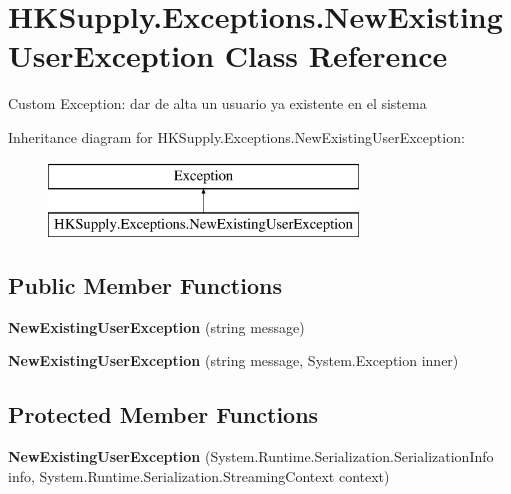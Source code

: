 \hypertarget{class_h_k_supply_1_1_exceptions_1_1_new_existing_user_exception}{}\section{H\+K\+Supply.\+Exceptions.\+New\+Existing\+User\+Exception Class Reference}
\label{class_h_k_supply_1_1_exceptions_1_1_new_existing_user_exception}


Custom Exception\+: dar de alta un usuario ya existente en el sistema  


Inheritance diagram for H\+K\+Supply.\+Exceptions.\+New\+Existing\+User\+Exception\+:\begin{figure}[H]
\begin{center}
\leavevmode
\includegraphics[height=2.000000cm]{class_h_k_supply_1_1_exceptions_1_1_new_existing_user_exception}
\end{center}
\end{figure}
\subsection*{Public Member Functions}
\begin{DoxyCompactItemize}
\item 
\mbox{\label{class_h_k_supply_1_1_exceptions_1_1_new_existing_user_exception_ab2021ca5058ce5ace749b56519f6fdab}} 
{\bfseries New\+Existing\+User\+Exception} (string message)
\item 
\mbox{\label{class_h_k_supply_1_1_exceptions_1_1_new_existing_user_exception_a8514fcb25cba282c24871071d9eb28bb}} 
{\bfseries New\+Existing\+User\+Exception} (string message, System.\+Exception inner)
\end{DoxyCompactItemize}
\subsection*{Protected Member Functions}
\begin{DoxyCompactItemize}
\item 
\mbox{\label{class_h_k_supply_1_1_exceptions_1_1_new_existing_user_exception_a12b02cfddf08f6c91fdff4bad9c0e65b}} 
{\bfseries New\+Existing\+User\+Exception} (System.\+Runtime.\+Serialization.\+Serialization\+Info info, System.\+Runtime.\+Serialization.\+Streaming\+Context context)
\end{DoxyCompactItemize}



